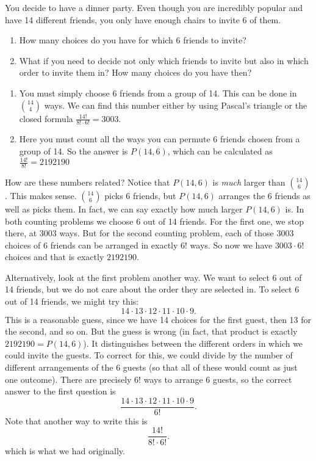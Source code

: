 \documentclass[12pt]{article}
\begin{document}
\begin{example}
  You decide to have a dinner party.  Even though you are incredibly popular and have 14 different friends, you only have enough chairs to invite 6 of them.  
  \begin{enumerate}
    \item How many choices do you have for which 6 friends to invite? 
    \item What if you need to decide not only which friends to invite but also in which order to invite them in?  How many choices do you have then?
  \end{enumerate}
  \begin{solution}
    \begin{enumerate}

      \item You must simply choose 6 friends from a group of 14.  This can be done in ${14 \choose 4}$ ways.  We can find this number either by using Pascal's triangle or the closed formula $\frac{14!}{8!\cdot 6!} = 3003$.
      
      \item Here you must count all the ways you can permute 6 friends chosen from a group of 14.  So the answer is $P(14, 6)$, which can be calculated as $\frac{14!}{8!} = 2192190$
   \end{enumerate}
    How are these numbers related?  Notice that $P(14,6)$ is {\em much} larger than ${14 \choose 6}$.  This makes sense. ${14 \choose 6}$ picks 6 friends, but $P(14,6)$  arranges the 6 friends as well as picks them.  In fact, we can say exactly how much larger $P(14,6)$ is.  In both counting problems we choose 6 out of 14 friends.  For the first one, we stop there, at 3003 ways.  But for the second counting problem, each of those 3003 choices of 6 friends can be arranged in exactly $6!$ ways.  So now we have $3003\cdot 6!$ choices and that is exactly $2192190$.
    
    Alternatively, look at the first problem another way.  We want to select 6 out of 14 friends, but we do not care about the order they are selected in.  To select 6 out of 14 friends, we might try this:
    \[14 \cdot 13 \cdot 12 \cdot 11 \cdot 10 \cdot 9.\]
    This is a reasonable guess, since we have 14 choices for the first guest, then 13 for the second, and so on.  But the guess is wrong (in fact, that product is exactly $2192190 = P(14,6)$).  It distinguishes between the different orders in which we could invite the guests.  To correct for this, we could divide by the number of different arrangements of the 6 guests (so that all of these would count as just one outcome).  There are precisely $6!$ ways to arrange 6 guests, so the correct answer to the first question is
    \[\frac{14 \cdot 13 \cdot 12 \cdot 11\cdot 10 \cdot 9}{6!}.\]
    Note that another way to write this is
    \[\frac{14!}{8!\cdot 6!}.\]
    which is what we had originally.
  \end{solution}

\end{example}
\end{document}

